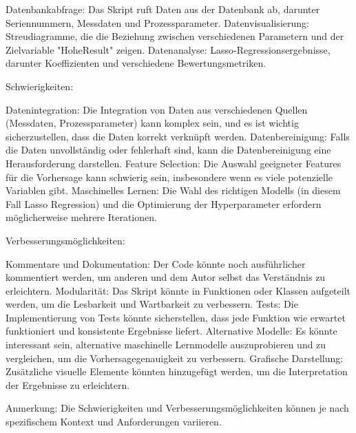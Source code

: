     Datenbankabfrage: Das Skript ruft Daten aus der Datenbank ab, darunter Seriennummern, Messdaten und Prozessparameter.
    Datenvisualisierung: Streudiagramme, die die Beziehung zwischen verschiedenen Parametern und der Zielvariable "HoheResult" zeigen.
    Datenanalyse: Lasso-Regressionsergebnisse, darunter Koeffizienten und verschiedene Bewertungsmetriken.

Schwierigkeiten:

    Datenintegration: Die Integration von Daten aus verschiedenen Quellen (Messdaten, Prozessparameter) kann komplex sein, und es ist wichtig sicherzustellen, dass die Daten korrekt verknüpft werden.
    Datenbereinigung: Falls die Daten unvollständig oder fehlerhaft sind, kann die Datenbereinigung eine Herausforderung darstellen.
    Feature Selection: Die Auswahl geeigneter Features für die Vorhersage kann schwierig sein, insbesondere wenn es viele potenzielle Variablen gibt.
    Maschinelles Lernen: Die Wahl des richtigen Modells (in diesem Fall Lasso Regression) und die Optimierung der Hyperparameter erfordern möglicherweise mehrere Iterationen.

Verbesserungsmöglichkeiten:

    Kommentare und Dokumentation: Der Code könnte noch ausführlicher kommentiert werden, um anderen und dem Autor selbst das Verständnis zu erleichtern.
    Modularität: Das Skript könnte in Funktionen oder Klassen aufgeteilt werden, um die Lesbarkeit und Wartbarkeit zu verbessern.
    Tests: Die Implementierung von Tests könnte sicherstellen, dass jede Funktion wie erwartet funktioniert und konsistente Ergebnisse liefert.
    Alternative Modelle: Es könnte interessant sein, alternative maschinelle Lernmodelle auszuprobieren und zu vergleichen, um die Vorhersagegenauigkeit zu verbessern.
    Grafische Darstellung: Zusätzliche visuelle Elemente könnten hinzugefügt werden, um die Interpretation der Ergebnisse zu erleichtern.

Anmerkung:
Die Schwierigkeiten und Verbesserungsmöglichkeiten können je nach spezifischem Kontext und Anforderungen variieren.
